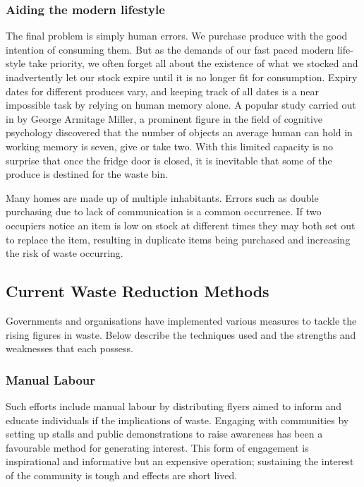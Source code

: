 \documentclass[a4paper, 11pt]{article}
\begin{document}
\subsubsection{Aiding the modern lifestyle}
The final problem is simply human errors. We purchase produce with the good intention of consuming them. But as the demands of our fast paced modern life-style take priority, we often forget all about the existence of what we stocked and inadvertently let our stock expire until it is no longer fit for consumption. Expiry dates for different produces vary, and keeping track of all dates is a near impossible task by relying on human memory alone. A popular study carried out in by George Armitage Miller, a prominent figure in the field of cognitive psychology discovered that the number of objects an average human can hold in working memory is seven, give or take two. With this limited capacity is no surprise that once the fridge door is closed, it is inevitable that some of the produce is destined for the waste bin.

Many homes are made up of multiple inhabitants. Errors such as double purchasing due to lack of communication is a common occurrence. If two occupiers notice an item is low on stock at different times they may both set out to replace the item, resulting in duplicate items being purchased and increasing the risk of waste occurring. 


\vspace{\baselineskip}
\vspace{\baselineskip}
\subsection{Current Waste Reduction Methods}
Governments and organisations have implemented various measures to tackle the rising figures in waste. Below describe the techniques used and the strengths and weaknesses that each possess. 

\subsubsection{Manual Labour} 
Such efforts include manual labour by distributing flyers aimed to inform and educate individuals if the implications of waste. Engaging with communities by setting up stalls and public demonstrations to raise awareness has been a favourable method for generating interest. This form of engagement is inspirational and informative but an expensive operation; sustaining the interest of the community is tough and effects are short lived.
\end{document}
